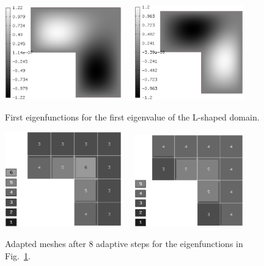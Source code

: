 \documentclass[smallextended]{svjour3}
\begin{document}
\begin{figure}[!ht]
\begin{center}
\includegraphics[width=0.45\textwidth]{lshape5.eps}\ \ \ 
\includegraphics[width=0.42\textwidth]{lshape6.eps}
\end{center}
\caption{First eigenfunctions for the first eigenvalue of the L-shaped domain.}
\label{fig:l_sh_eig3}
\end{figure}

\begin{figure}[!ht]
\begin{center}
\includegraphics[width=0.45\textwidth]{lshape7.eps}\ \ \ 
\includegraphics[width=0.42\textwidth]{lshape8.eps}
\end{center}
\caption{Adapted meshes after 8 adaptive steps for the eigenfunctions in Fig.~\ref{fig:l_sh_eig3}.}
\label{fig:l_sh_eig4}
\end{figure}
\end{document}
